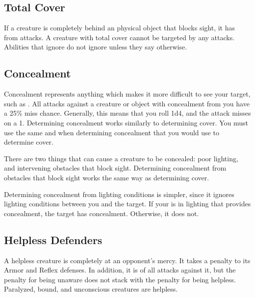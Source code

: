     \subsection{Total Cover}\label{Total Cover}
        If a creature is completely behind an physical object that blocks sight, it has  from attacks.
        A creature with total cover cannot be targeted by any attacks.
        Abilities that ignore  do not ignore  unless they say otherwise.

    \subsection{Concealment}\label{Concealment}
        Concealment represents anything which makes it more difficult to see your target, such as .
        All attacks against a creature or object with concealment from you have a 25\% miss chance.
        Generally, this means that you roll 1d4, and the attack misses on a 1.
        Determining concealment works similarly to determining cover.
        You must use the same  and  when determining concealment that you would use to determine cover.

         There are two things that can cause a creature to be concealed: poor lighting, and intervening obstacles that block sight.
        Determining concealment from obstacles that block sight works the same way as determining cover.

        Determining concealment from lighting conditions is simpler, since it ignores lighting conditions between you and the target.
        If your  is in lighting that provides concealment, the target has concealment.
        Otherwise, it does not.

    \subsection{Helpless Defenders}
        A helpless creature is completely at an opponent's mercy.
        It takes a  penalty to its Armor and Reflex defenses.
        In addition, it is \unaware of all attacks against it, but the penalty for being unaware does not stack with the penalty for being helpless.
        Paralyzed, bound, and unconscious creatures are helpless.

